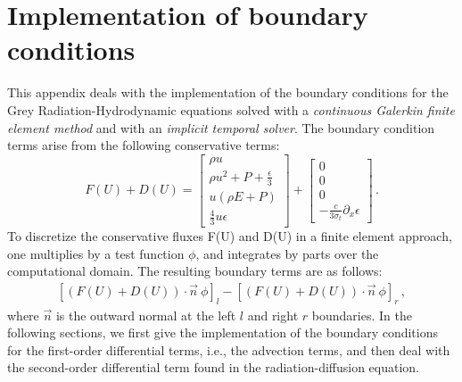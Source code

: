 \section{Implementation of boundary conditions} \label{App:AppendixA}

This appendix deals with the implementation of the boundary conditions for the Grey Radiation-Hydrodynamic equations solved with a \emph{continuous Galerkin finite element method} and with an \emph{implicit temporal solver}. The boundary condition terms arise from the following conservative terms:
%
\begin{equation}\label{eq:bc-fluxes}
F(U) + D(U) = 
\begin{bmatrix}
\rho u \\
\rho u^2 + P + \frac{\epsilon}{3} \\
u \left( \rho E + P \right) \\
\frac{4}{3} u \epsilon
\end{bmatrix}
+  
\begin{bmatrix}
0 \\
0 \\
0 \\
- \frac{c}{3 \sigma_t} \partial_x \epsilon
\end{bmatrix}
\,.
\end{equation}
%
To discretize the conservative fluxes F(U) and D(U) in a finite element approach, one multiplies by a test function $\phi$, and integrates by parts over the computational domain. The resulting boundary terms are as follows:
%
\begin{eqnarray}
\left[\left(F(U)+D(U)\right) \cdot \vec{n} \ \phi \right]_{l} - \left[ \left(F(U)+D(U)\right) \cdot \vec{n} \ \phi \right]_{r} \, ,
\end{eqnarray}
%
where $\vec{n}$ is the outward normal at the left $l$ and right $r$ boundaries. 
In the following sections, we first give the implementation of the boundary conditions for the first-order differential terms, i.e., the advection terms, and then deal with the second-order differential term found in the radiation-diffusion equation. 
%
%
